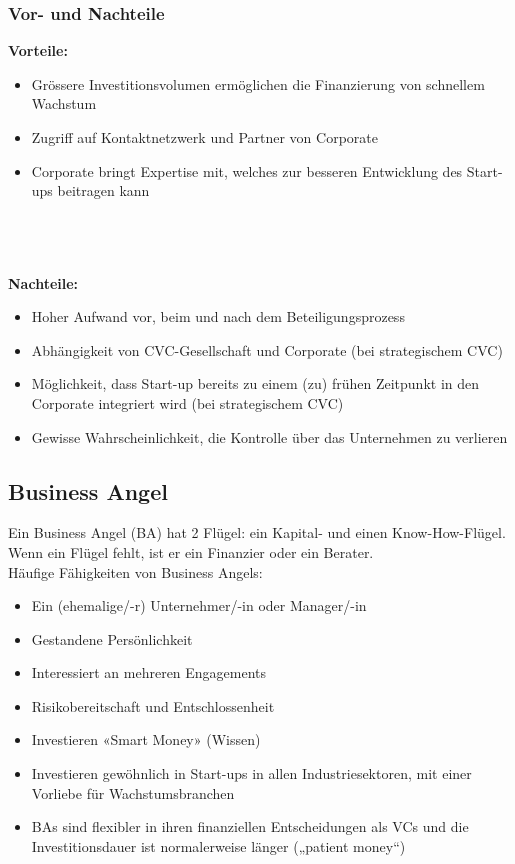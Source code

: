 \subsubsection{Vor- und Nachteile}
\begin{multicols}{2}
	\textbf{Vorteile:}
	\begin{itemize}
		\item Grössere Investitionsvolumen ermöglichen die Finanzierung von schnellem Wachstum
		\item Zugriff auf Kontaktnetzwerk und Partner von Corporate
		\item Corporate bringt Expertise mit, welches zur besseren Entwicklung des Start-ups beitragen kann
	\end{itemize}
	\ \\ \ \\ \ \\
	\textbf{Nachteile:}
	\begin{itemize}
		\item Hoher Aufwand vor, beim und nach dem Beteiligungsprozess
		\item Abhängigkeit von CVC-Gesellschaft und Corporate (bei strategischem CVC)
		\item Möglichkeit, dass Start-up bereits zu einem (zu) frühen Zeitpunkt in den Corporate integriert wird (bei strategischem CVC)
		\item Gewisse Wahrscheinlichkeit, die Kontrolle über das Unternehmen zu verlieren
	\end{itemize}
\end{multicols}

\subsection{Business Angel}
Ein Business Angel (BA) hat 2 Flügel: ein Kapital- und einen Know-How-Flügel. Wenn ein Flügel fehlt, ist er ein Finanzier oder ein Berater. \\

Häufige Fähigkeiten von Business Angels:
\begin{itemize}
	\item Ein (ehemalige/-r) Unternehmer/-in oder Manager/-in
	\item Gestandene Persönlichkeit
	\item Interessiert an mehreren Engagements
	\item Risikobereitschaft und Entschlossenheit
	\item Investieren «Smart Money» (Wissen)
	\item Investieren gewöhnlich in Start-ups in allen Industriesektoren, mit einer Vorliebe für Wachstumsbranchen
	\item BAs sind flexibler in ihren finanziellen Entscheidungen als VCs und die Investitionsdauer ist normalerweise länger („patient money“)
\end{itemize}

